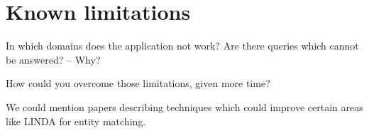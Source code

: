 \section{Known limitations}
In which domains does the application not work? 
Are there queries which cannot be answered? – Why? 

How could you overcome those limitations, given more time?

We could mention papers describing techniques which could improve certain areas like LINDA \cite{boehm_linda:_2012} for entity matching. 